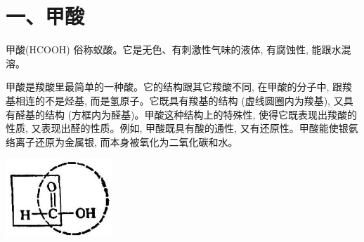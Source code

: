 \documentclass[10pt]{article}
\begin{document}
\begin{center}
\end{center}

\section*{一、甲酸}

甲酸(HCOOH) 俗称蚁酸。它是无色、有刺激性气味的液体, 有腐蚀性, 能跟水混溶。

甲酸是羧酸里最简单的一种酸。它的结构跟其它羧酸不同, 在甲酸的分子中, 跟羧基相连的不是烃基, 而是氢原子。它既具有羧基的结构 (虚线圆圈内为羧基), 又具有醛基的结构 (方框内为醛基)。甲酸这种结构上的特殊性, 使得它既表现出羧酸的性质, 又表现出醛的性质。例如, 甲酸既具有酸的通性, 又有还原性。甲酸能使银氨络离子还原为金属银, 而本身被氧化为二氧化碳和水。

\begin{center}
\includegraphics[max width=0.3\textwidth]{images/01912d16-be99-77bb-9535-4f3ed8d9946f_137_664704.jpg}
\end{center}
\end{document}
